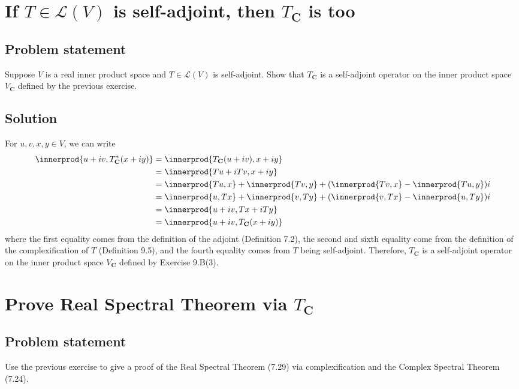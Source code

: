 \documentclass{article}
\DeclarePairedDelimiter{\innerprod}\langle\rangle
\begin{document}
\clearpage

\section{If $T\in\mathcal{L}(V)$ is self-adjoint, then $T_{\textbf{C}}$ is too}
\subsection*{Problem statement}
Suppose $V$ is a real inner product space and $T\in\mathcal{L}(V)$ is self-adjoint. 
Show that $T_{\textbf{C}}$ is a self-adjoint operator on the inner product space $V_{\textbf{C}}$ defined by the previous exercise.

\subsection*{Solution}
For $u,v,x,y\in V$, we can write
\begin{align*}
    \innerprod{u+iv,T^*_{\textbf{C}}(x+iy)}&=\innerprod{T_{\textbf{C}}(u+iv),x+iy}\\
    &=\innerprod{Tu+iTv,x+iy}\\
    &=\innerprod{Tu,x} +\innerprod{Tv,y} + (\innerprod{Tv,x} - \innerprod{Tu,y})i\\
    &=\innerprod{u,Tx} +\innerprod{v,Ty} + (\innerprod{v,Tx} - \innerprod{u,Ty})i\\
    &=\innerprod{u+iv,Tx+iTy}\\
    &=\innerprod{u+iv,T_{\textbf{C}}(x+iy)}
\end{align*}
where the first equality comes from the definition of the adjoint (Definition 7.2), the second and sixth equality come from the definition of the complexification of $T$ (Definition 9.5), and the fourth equality comes from $T$ being self-adjoint. 
Therefore, $T_{\textbf{C}}$ is a self-adjoint operator on the inner product space $V_{\textbf{C}}$ defined by Exercise 9.B(3).

\clearpage

\section{Prove Real Spectral Theorem via $T_{\textbf{C}}$}
\subsection*{Problem statement}
Use the previous exercise to give a proof of the Real Spectral Theorem (7.29) via complexification and the Complex Spectral Theorem (7.24).
\end{document}
